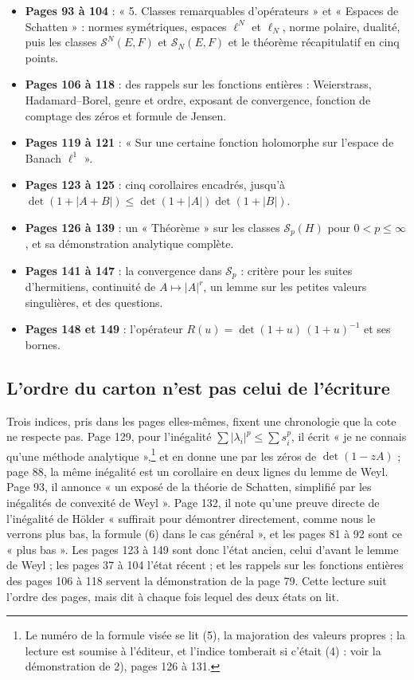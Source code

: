 \documentclass[11pt,a4paper]{article}
\begin{document}
\begin{itemize}
    de Hilbert, dont l'inégalité de Hölder et l'inégalité triangulaire des
    normes de Schatten.
  \item \textbf{Pages 93 à 104} : « 5. Classes remarquables d'opérateurs »
    et « Espaces de Schatten » : normes symétriques, espaces $\ell^N$ et
    $\ell_N$, norme polaire, dualité, puis les classes
    $\mathcal{S}^N(E,F)$ et $\mathcal{S}_N(E,F)$ et le théorème récapitulatif
    en cinq points.
  \item \textbf{Pages 106 à 118} : des rappels sur les fonctions entières :
    Weierstrass, Hadamard--Borel, genre et ordre, exposant de convergence,
    fonction de comptage des zéros et formule de Jensen.
  \item \textbf{Pages 119 à 121} : « Sur une certaine fonction holomorphe
    sur l'espace de Banach $\ell^1$ ».
  \item \textbf{Pages 123 à 125} : cinq corollaires encadrés, jusqu'à
    $\det(1+|A+B|) \leq \det(1+|A|)\det(1+|B|)$.
  \item \textbf{Pages 126 à 139} : un « Théorème » sur les classes
    $\mathcal{S}_p(H)$ pour $0 < p \leq \infty$, et sa démonstration
    analytique complète.
  \item \textbf{Pages 141 à 147} : la convergence dans $\mathcal{S}_p$ :
    critère pour les suites d'hermitiens, continuité de $A \mapsto |A|^r$,
    un lemme sur les petites valeurs singulières, et des questions.
  \item \textbf{Pages 148 et 149} : l'opérateur $R(u) = \det(1+u)\,(1+u)^{-1}$
    et ses bornes.
\end{itemize}

\subsection*{L'ordre du carton n'est pas celui de l'écriture}

Trois indices, pris dans les pages elles-mêmes, fixent une chronologie que
la cote ne respecte pas. Page 129, pour l'inégalité $\sum |\lambda_i|^p \leq
\sum s_i^p$, il écrit « je ne connais qu'une méthode analytique »,\footnote{Le
numéro de la formule visée se lit (5), la majoration des valeurs propres ;
la lecture est soumise à l'éditeur, et l'indice tomberait si c'était (4) :
voir la démonstration de 2), pages 126 à 131.} et en donne
une par les zéros de $\det(1 - zA)$ ; page 88, la même inégalité est un
corollaire en deux lignes du lemme de Weyl. Page 93, il annonce « un exposé de
la théorie de Schatten, simplifié par les inégalités de convexité de Weyl ».
Page 132, il note qu'une preuve directe de l'inégalité de Hölder « suffirait
pour démontrer directement, comme nous le verrons plus bas, la formule (6)
dans le cas général », et les pages 81 à 92 sont ce « plus bas ». Les pages
123 à 149 sont donc l'état ancien, celui d'avant le lemme de Weyl ; les pages
37 à 104 l'état récent ; et les rappels sur les fonctions entières des pages
106 à 118 servent la démonstration de la page 79. Cette lecture suit l'ordre
des pages, mais dit à chaque fois lequel des deux états on lit.
\end{document}
